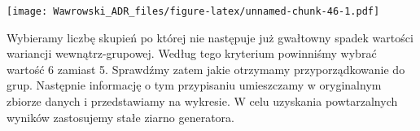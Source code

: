 \documentclass[
]{book}
\newenvironment{Shaded}{\begin{snugshade}}{\end{snugshade}}
\newcommand{\CommentTok}[1]{\textcolor[rgb]{0.56,0.35,0.01}{\textit{#1}}}
\newcommand{\ControlFlowTok}[1]{\textcolor[rgb]{0.13,0.29,0.53}{\textbf{#1}}}
\newcommand{\DataTypeTok}[1]{\textcolor[rgb]{0.13,0.29,0.53}{#1}}
\newcommand{\DecValTok}[1]{\textcolor[rgb]{0.00,0.00,0.81}{#1}}
\newcommand{\KeywordTok}[1]{\textcolor[rgb]{0.13,0.29,0.53}{\textbf{#1}}}
\newcommand{\NormalTok}[1]{#1}
\newcommand{\OperatorTok}[1]{\textcolor[rgb]{0.81,0.36,0.00}{\textbf{#1}}}
\newcommand{\StringTok}[1]{\textcolor[rgb]{0.31,0.60,0.02}{#1}}
\begin{document}
\begin{Shaded}
\end{Shaded}

\texttt{[image: Wawrowski\_ADR\_files/figure-latex/unnamed-chunk-46-1.pdf]}

Wybieramy liczbę skupień po której nie następuje już gwałtowny spadek wartości wariancji wewnątrz-grupowej. Według tego kryterium powinniśmy wybrać wartość 6 zamiast 5. Sprawdźmy zatem jakie otrzymamy przyporządkowanie do grup. Następnie informację o tym przypisaniu umieszczamy w oryginalnym zbiorze danych i przedstawiamy na wykresie. W celu uzyskania powtarzalnych wyników zastosujemy stałe ziarno generatora.

\begin{Shaded}
\end{Shaded}
\end{document}
